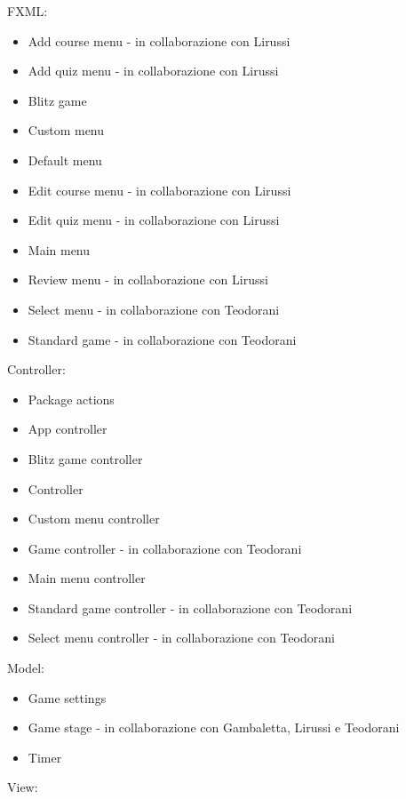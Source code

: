     FXML:
    \begin{itemize}
        \item Add course menu - in collaborazione con Lirussi
        \item Add quiz menu - in collaborazione con Lirussi
        \item Blitz game
        \item Custom menu
        \item Default menu
        \item Edit course menu - in collaborazione con Lirussi
        \item Edit quiz menu - in collaborazione con Lirussi
        \item Main menu
        \item Review menu - in collaborazione con Lirussi
        \item Select menu - in collaborazione con Teodorani
        \item Standard game - in collaborazione con Teodorani
    \end{itemize}
    Controller:
    \begin{itemize}
        \item Package actions
        \item App controller
        \item Blitz game controller
        \item Controller
        \item Custom menu controller
        \item Game controller - in collaborazione con Teodorani
        \item Main menu controller
        \item Standard game controller - in collaborazione con Teodorani
        \item Select menu controller - in collaborazione con Teodorani
    \end{itemize}
    Model:
    \begin{itemize}
        \item Game settings
        \item Game stage - in collaborazione con Gambaletta, Lirussi e Teodorani
        \item Timer
    \end{itemize}
    View:
